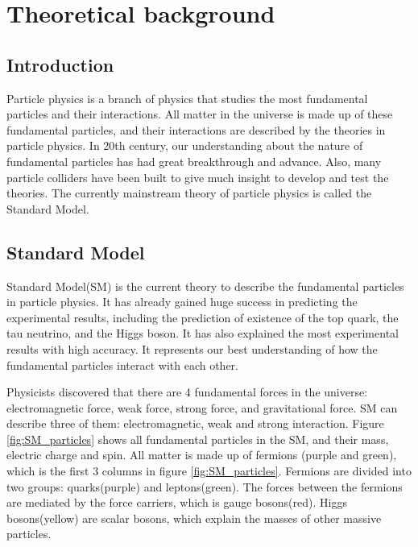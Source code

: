 \chapter{Theoretical background}
\label{ch:theory}

\section{Introduction}
Particle physics is a branch of physics that studies the most fundamental particles and their interactions.
All matter in the universe is made up of these fundamental particles, and their interactions are described by the theories in particle physics.
In 20th century, our understanding about the nature of fundamental particles has had great breakthrough and  advance.
Also, many particle colliders have been built to give much insight to develop and test the theories.
The currently mainstream theory of particle physics is called the Standard Model.

\section{Standard Model}
\label{sec:Standard_Model}
Standard Model(SM) is the current theory to describe the fundamental particles in particle physics.
It has already gained huge success in predicting the experimental results, including the prediction of existence of the top quark, the tau neutrino, and the Higgs boson.
It has also explained the most experimental results with high accuracy.
It represents our best understanding of how the fundamental particles interact with each other.

Physicists discovered that there are 4 fundamental forces in the universe: electromagnetic force, weak force, strong force, and gravitational force.
SM can describe three of them: electromagnetic, weak and strong interaction.
Figure \ref{fig:SM_particles} shows all fundamental particles in the SM, and their mass, electric charge and spin.
All matter is made up of fermions (purple and green), which is the first 3 columns in figure \ref{fig:SM_particles}.
Fermions are divided into two groups: quarks(purple) and leptons(green).
The forces between the fermions are mediated by the force carriers, which is gauge bosons(red).
Higgs bosons(yellow) are scalar bosons, which explain the masses of other massive particles.

